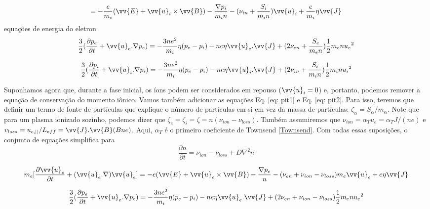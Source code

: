 \documentclass[12pt,oneside,a4paper]{abntex2}
\begin{document}
\begin{equation}
[\frac{\partial \vv{u}_i}{\partial t} + (\vv{u}_i . \nabla)\vv{u}_i] = - \frac{e}{m_i} (\vv{E}+\vv{u}_i \times \vv{B}) - \frac{\nabla p_i}{m_i n} - (\nu_{in}+\frac{S_i}{m_i n})\vv{u}_i + \frac{e}{m_i}\eta \vv{J} 
\end{equation}
equações de energia do eletron
\begin{equation}
\frac{3}{2} (\frac{\partial p_e}{\partial t} + \vv{u}_e . \nabla p_e) = -\frac{3ne^2}{m_i} \eta(p_e-p_i)-ne\eta \vv{u}_e.\vv{J}+(2 \nu_{en} + \frac{S_e}{m_e n} )\frac{1}{2}m_en{u_e}^2
\end{equation}

\begin{equation}
\frac{3}{2} (\frac{\partial p_i}{\partial t} + \vv{u}_i . \nabla p_i) = -\frac{3ne^2}{m_i} \eta(p_e-p_i)-ne\eta \vv{u}_i.\vv{J}+(2 \nu_{in} + \frac{S_i}{m_i n} )\frac{1}{2}m_in{u_i}^2
\end{equation}

Suponhamos agora que, durante a fase inicial, os íons podem ser considerados em repouso ($\vv{u}_i = 0$) e, portanto, podemos remover a equação de conservação do momento iônico. Vamos também adicionar as equações Eq. \ref{eq: pit1} e Eq. \ref{eq: pit2}. Para isso, teremos que definir um termo de fonte de partículas que explique o número de partículas em si em vez da massa de partículas: $\zeta_\alpha = S_\alpha / m_\alpha$. Note que para um plasma ionizado sozinho, podemos dizer que $\zeta_e = \zeta_i = \zeta = n(\nu_{ion} - \nu_{loss})$. Também assumiremos que $\nu_{ion} = \alpha_T u_e = \alpha_T J / (ne)$ e $v_{loss} = u_{e, ||} / L_{eff} = \vv{J}.\vv{B} (Bne)$. Aqui, $\alpha_T$ é o primeiro coeficiente de Townsend \ref{Townsend}. Com todas essas suposições, o conjunto de equações simplifica para
\begin{equation}
\frac{\partial n}{\partial t} = \nu_{ion} - \nu_{loss}+D\nabla^2n
\end{equation}

\begin{equation}
m_e[\frac{\partial \vv{u}_e}{\partial t} + (\vv{u}_e . \nabla)\vv{u}_e] = - e (\vv{E}+\vv{u}_e \times \vv{B}) - \frac{\nabla p_e}{n} -(\nu_{en}+\nu_{ion}-\nu_{loss})m_e \vv{u}_e+ e\eta \vv{J} 
\end{equation}

\begin{equation}
\frac{3}{2} (\frac{\partial p_e}{\partial t} + \vv{u}_e . \nabla p_e) = -\frac{3ne^2}{m_i} \eta(p_e-p_i)-ne\eta \vv{u}_e.\vv{J}+(2 \nu_{en} + \nu_{ion} - \nu_{loss} )\frac{1}{2}m_en{u_e}^2
\end{equation}
\end{document}
